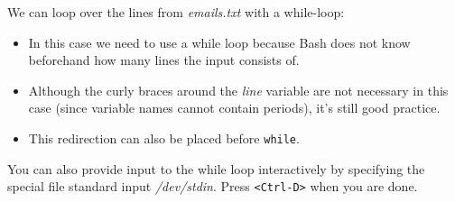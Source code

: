 \documentclass[
]{book}
\newenvironment{Shaded}{\begin{snugshade}}{\end{snugshade}}
\newcommand{\BuiltInTok}[1]{#1}
\newcommand{\ExtensionTok}[1]{#1}
\newcommand{\KeywordTok}[1]{\textcolor[rgb]{0.13,0.29,0.53}{\textbf{#1}}}
\newcommand{\NormalTok}[1]{#1}
\newcommand{\OperatorTok}[1]{\textcolor[rgb]{0.81,0.36,0.00}{\textbf{#1}}}
\newcommand{\StringTok}[1]{\textcolor[rgb]{0.31,0.60,0.02}{#1}}
\newcommand{\VariableTok}[1]{\textcolor[rgb]{0.00,0.00,0.00}{#1}}
\providecommand{\tightlist}{%
  \setlength{\itemsep}{0pt}\setlength{\parskip}{0pt}}
\theoremstyle{definition}
\theoremstyle{definition}
\theoremstyle{definition}
\theoremstyle{remark}
\begin{document}
We can loop over the lines from \emph{emails.txt} with a while-loop:

\begin{Shaded}
\end{Shaded}

\begin{itemize}
\tightlist
\item
  In this case we need to use a while loop because Bash does not know beforehand how many lines the input consists of.
\item
  Although the curly braces around the \emph{line} variable are not necessary in this case (since variable names cannot contain periods), it's still good practice.
\item
  This redirection can also be placed before \texttt{while}.
\end{itemize}

You can also provide input to the while loop interactively by specifying the special file standard input \emph{/dev/stdin}. Press \texttt{\textless{}Ctrl-D\textgreater{}} when you are done.

\begin{Shaded}
\end{Shaded}
\end{document}

